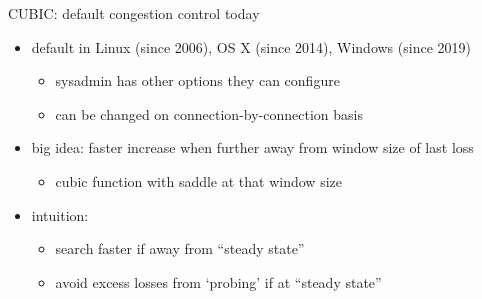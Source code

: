 \begin{frame}{CUBIC: default congestion control today}
    \begin{itemize}
    \item default in Linux (since 2006), OS X (since 2014), Windows (since 2019)
        \begin{itemize}
        \item sysadmin has other options they can configure
        \item can be changed on connection-by-connection basis
        \end{itemize}
    \vspace{.5cm}
    \item big idea: faster increase when further away from window size of last loss
        \begin{itemize}
        \item cubic function with saddle at that window size
        \end{itemize}
    \item intuition: 
        \begin{itemize}
        \item search faster if away from ``steady state''
        \item avoid excess losses from `probing' if at ``steady state''
        \end{itemize}
    \end{itemize}
\end{frame}
